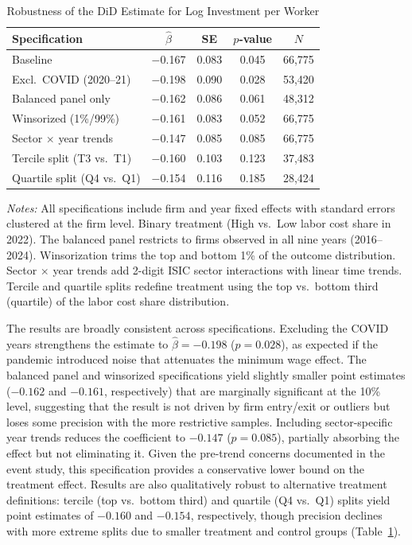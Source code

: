 \documentclass[5p,times,authoryear]{elsarticle}
\begin{document}
\begin{table}[htbp]
\centering
\begin{threeparttable}
\caption{Robustness of the DiD Estimate for Log Investment per Worker}
\label{tab:robustness}
\small
\setlength{\tabcolsep}{5pt}
\begin{tabular}{@{}lcccc@{}}
\toprule
Specification & $\hat{\beta}$ & SE & $p$-value & $N$ \\
\midrule
Baseline & $-$0.167 & 0.083 & 0.045 & 66,775 \\
Excl.\ COVID (2020--21) & $-$0.198 & 0.090 & 0.028 & 53,420 \\
Balanced panel only & $-$0.162 & 0.086 & 0.061 & 48,312 \\
Winsorized (1\%/99\%) & $-$0.161 & 0.083 & 0.052 & 66,775 \\
Sector $\times$ year trends & $-$0.147 & 0.085 & 0.085 & 66,775 \\
Tercile split (T3 vs.\ T1) & $-$0.160 & 0.103 & 0.123 & 37,483 \\
Quartile split (Q4 vs.\ Q1) & $-$0.154 & 0.116 & 0.185 & 28,424 \\
\bottomrule
\end{tabular}
\begin{tablenotes}
\footnotesize
\item \textit{Notes:} All specifications include firm and year fixed effects with standard errors clustered at the firm level. Binary treatment (High vs.\ Low labor cost share in 2022). The balanced panel restricts to firms observed in all nine years (2016--2024). Winsorization trims the top and bottom 1\% of the outcome distribution. Sector $\times$ year trends add 2-digit ISIC sector interactions with linear time trends. Tercile and quartile splits redefine treatment using the top vs.\ bottom third (quartile) of the labor cost share distribution.
\end{tablenotes}
\end{threeparttable}
\end{table}

The results are broadly consistent across specifications. Excluding the COVID years strengthens the estimate to $\hat{\beta} = -0.198$ ($p = 0.028$), as expected if the pandemic introduced noise that attenuates the minimum wage effect. The balanced panel and winsorized specifications yield slightly smaller point estimates ($-0.162$ and $-0.161$, respectively) that are marginally significant at the 10\% level, suggesting that the result is not driven by firm entry/exit or outliers but loses some precision with the more restrictive samples. Including sector-specific year trends reduces the coefficient to $-0.147$ ($p = 0.085$), partially absorbing the effect but not eliminating it. Given the pre-trend concerns documented in the event study, this specification provides a conservative lower bound on the treatment effect. Results are also qualitatively robust to alternative treatment definitions: tercile (top vs.\ bottom third) and quartile (Q4 vs.\ Q1) splits yield point estimates of $-0.160$ and $-0.154$, respectively, though precision declines with more extreme splits due to smaller treatment and control groups (Table~\ref{tab:robustness}).
\end{document}

